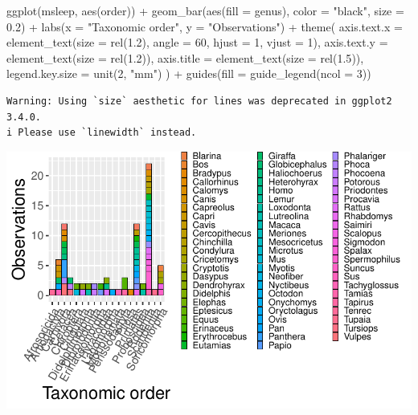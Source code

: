 \documentclass[
  letterpaper,
  DIV=11,
  numbers=noendperiod]{scrartcl}
\newenvironment{Shaded}{\begin{snugshade}}{\end{snugshade}}
\newcommand{\AttributeTok}[1]{\textcolor[rgb]{0.40,0.45,0.13}{#1}}
\newcommand{\DecValTok}[1]{\textcolor[rgb]{0.68,0.00,0.00}{#1}}
\newcommand{\FloatTok}[1]{\textcolor[rgb]{0.68,0.00,0.00}{#1}}
\newcommand{\FunctionTok}[1]{\textcolor[rgb]{0.28,0.35,0.67}{#1}}
\newcommand{\NormalTok}[1]{\textcolor[rgb]{0.00,0.23,0.31}{#1}}
\newcommand{\SpecialCharTok}[1]{\textcolor[rgb]{0.37,0.37,0.37}{#1}}
\newcommand{\StringTok}[1]{\textcolor[rgb]{0.13,0.47,0.30}{#1}}
\begin{document}
\begin{Shaded}
\begin{Highlighting}[]
\FunctionTok{ggplot}\NormalTok{(msleep, }\FunctionTok{aes}\NormalTok{(order)) }\SpecialCharTok{+}
  \FunctionTok{geom\_bar}\NormalTok{(}\FunctionTok{aes}\NormalTok{(}\AttributeTok{fill =}\NormalTok{ genus), }\AttributeTok{color =} \StringTok{"black"}\NormalTok{, }\AttributeTok{size =} \FloatTok{0.2}\NormalTok{) }\SpecialCharTok{+}
  \FunctionTok{labs}\NormalTok{(}\AttributeTok{x =} \StringTok{"Taxonomic order"}\NormalTok{, }\AttributeTok{y =} \StringTok{"Observations"}\NormalTok{) }\SpecialCharTok{+}
  \FunctionTok{theme}\NormalTok{(}
    \AttributeTok{axis.text.x =} \FunctionTok{element\_text}\NormalTok{(}\AttributeTok{size =} \FunctionTok{rel}\NormalTok{(}\FloatTok{1.2}\NormalTok{), }\AttributeTok{angle =} \DecValTok{60}\NormalTok{, }\AttributeTok{hjust =} \DecValTok{1}\NormalTok{, }\AttributeTok{vjust =} \DecValTok{1}\NormalTok{),}
    \AttributeTok{axis.text.y =} \FunctionTok{element\_text}\NormalTok{(}\AttributeTok{size =} \FunctionTok{rel}\NormalTok{(}\FloatTok{1.2}\NormalTok{)),}
    \AttributeTok{axis.title =} \FunctionTok{element\_text}\NormalTok{(}\AttributeTok{size =} \FunctionTok{rel}\NormalTok{(}\FloatTok{1.5}\NormalTok{)),}
    \AttributeTok{legend.key.size =} \FunctionTok{unit}\NormalTok{(}\DecValTok{2}\NormalTok{, }\StringTok{"mm"}\NormalTok{)}
\NormalTok{    ) }\SpecialCharTok{+}
  \FunctionTok{guides}\NormalTok{(}\AttributeTok{fill =} \FunctionTok{guide\_legend}\NormalTok{(}\AttributeTok{ncol =} \DecValTok{3}\NormalTok{))}
\end{Highlighting}
\end{Shaded}

\begin{verbatim}
Warning: Using `size` aesthetic for lines was deprecated in ggplot2 3.4.0.
i Please use `linewidth` instead.
\end{verbatim}

\includegraphics{5-ggplot2_kevin_files/figure-pdf/unnamed-chunk-23-1.pdf}
\end{document}
